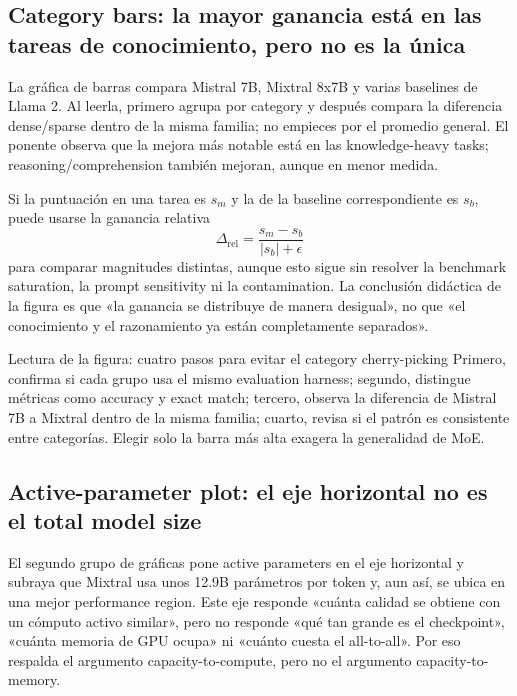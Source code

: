 \subsection{Category bars: la mayor ganancia está en las tareas de conocimiento, pero no es la única}

La gráfica de barras compara Mistral 7B, Mixtral 8x7B y varias baselines de Llama 2. Al leerla, primero agrupa por category y después compara la diferencia dense/sparse dentro de la misma familia; no empieces por el promedio general. El ponente observa que la mejora más notable está en las knowledge-heavy tasks; reasoning/comprehension también mejoran, aunque en menor medida.


Si la puntuación en una tarea es $s_m$ y la de la baseline correspondiente es $s_b$, puede usarse la ganancia relativa
\[
\Delta_{\mathrm{rel}}=\frac{s_m-s_b}{|s_b|+\epsilon}
\]
para comparar magnitudes distintas, aunque esto sigue sin resolver la benchmark saturation, la prompt sensitivity ni la contamination. La conclusión didáctica de la figura es que «la ganancia se distribuye de manera desigual», no que «el conocimiento y el razonamiento ya están completamente separados».

\begin{knowledgebox}{Lectura de la figura: cuatro pasos para evitar el category cherry-picking}
Primero, confirma si cada grupo usa el mismo evaluation harness; segundo, distingue métricas como accuracy y exact match; tercero, observa la diferencia de Mistral 7B a Mixtral dentro de la misma familia; cuarto, revisa si el patrón es consistente entre categorías. Elegir solo la barra más alta exagera la generalidad de MoE.
\end{knowledgebox}

\subsection{Active-parameter plot: el eje horizontal no es el total model size}

El segundo grupo de gráficas pone active parameters en el eje horizontal y subraya que Mixtral usa unos 12.9B parámetros por token y, aun así, se ubica en una mejor performance region. Este eje responde «cuánta calidad se obtiene con un cómputo activo similar», pero no responde «qué tan grande es el checkpoint», «cuánta memoria de GPU ocupa» ni «cuánto cuesta el all-to-all». Por eso respalda el argumento capacity-to-compute, pero no el argumento capacity-to-memory.

